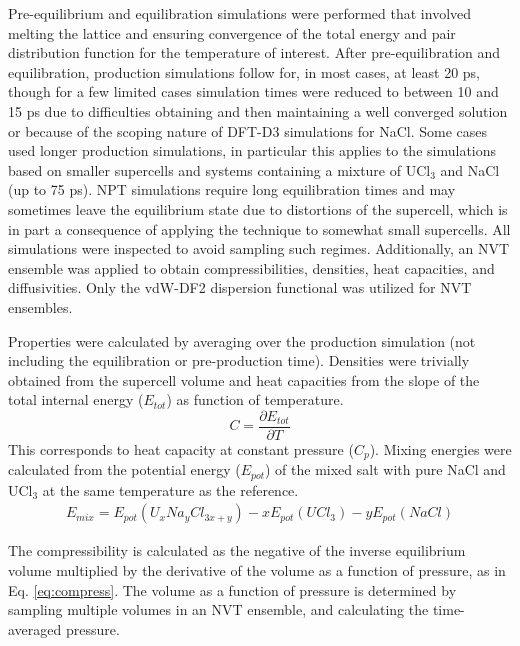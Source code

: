 \documentclass[preprint,3p,10pt,onecolumn,number,sort&compress]{elsarticle}
\begin{document}
Pre-equilibrium and equilibration simulations were performed that involved melting the lattice and ensuring convergence of the total energy and pair distribution function for the temperature of interest. After pre-equilibration and equilibration, production simulations follow for, in most cases, at least 20 ps, though for a few limited cases simulation times were reduced to between 10 and 15 ps due to difficulties obtaining and then maintaining a well converged solution or because of the scoping nature of DFT-D3 simulations for NaCl. Some cases used longer production simulations, in particular this applies to the simulations based on smaller supercells and systems containing a mixture of UCl$_3$ and NaCl (up to 75 ps). NPT simulations require long equilibration times and may sometimes leave the equilibrium state due to distortions of the supercell, which is in part a consequence of applying the technique to somewhat small supercells. All simulations were inspected to avoid sampling such regimes. Additionally, an NVT ensemble was applied to obtain compressibilities, densities, heat capacities, and diffusivities. Only the vdW-DF2 dispersion functional was utilized for NVT ensembles. 

Properties were calculated by averaging over the production simulation (not including the equilibration or pre-production time). Densities were trivially obtained from the supercell volume and heat capacities from the slope of the total internal energy ($E_{tot}$) as function of temperature. 
\begin{equation}
\label{eq:cp}
C=\frac{\partial E_{tot}}{\partial T}
\end{equation}
This corresponds to heat capacity at constant pressure ($C_p$). Mixing energies were calculated from the potential energy ($E_{pot}$) of the mixed salt with pure NaCl and UCl$_3$ at the same temperature as the reference. 
\begin{equation}
\begin{split}
E_{mix}=E_{pot}(U_xNa_yCl_{3x+y})-xE_{pot}(UCl_3)-yE_{pot}(NaCl)
\end{split}
\end{equation}

The compressibility is calculated as the negative of the inverse equilibrium volume multiplied by the derivative of the volume as a function of pressure, as in Eq. \ref{eq:compress}. The volume as a function of pressure is determined by sampling multiple volumes in an NVT ensemble, and calculating the time-averaged pressure. 
\end{document}
